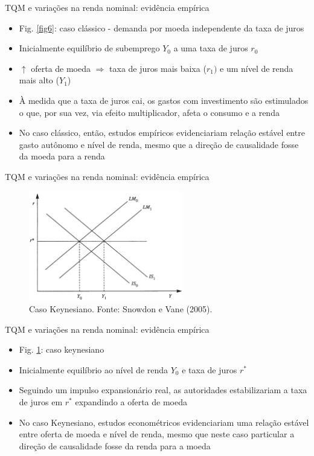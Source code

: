 \documentclass[10pt]{beamer}
\begin{document}
\begin{frame}{TQM e variações na renda nominal: evidência empírica}
    \begin{itemize}
        \item Fig. \ref{fig6}: caso clássico - demanda por moeda independente da taxa de juros
        \bigskip
        \item Inicialmente equilíbrio de subemprego $Y_0$ a uma taxa de juros $r_0$
        \bigskip
        \item $\uparrow$ oferta de moeda $\Rightarrow$ taxa de juros mais baixa ($r_1)$ e um nível de renda mais alto ($Y_1$)
        \bigskip
        \item À medida que a taxa de juros cai, os gastos com investimento são estimulados o que, por sua vez, via efeito multiplicador, afeta o consumo e a renda
        \bigskip
        \item No caso clássico, então, estudos empíricos evidenciariam relação estável entre gasto autônomo e nível de renda, mesmo que a direção de causalidade fosse da moeda para a renda
    \end{itemize}
\end{frame}

\begin{frame}{TQM e variações na renda nominal: evidência empírica}
    \begin{figure}
        \centering
        \includegraphics[width=0.6\textwidth]{./figures/aula10_fig7.PNG}
        \caption{Caso Keynesiano. Fonte: Snowdon e Vane (2005).}
        \label{fig7}
    \end{figure}
\end{frame}

\begin{frame}{TQM e variações na renda nominal: evidência empírica}
    \begin{itemize}
        \item Fig. \ref{fig7}: caso keynesiano
        \bigskip
        \item Inicialmente equilíbrio ao nível de renda $Y_0$ e taxa de juros $r^*$
        \bigskip
        \item Seguindo um impulso expansionário real, as autoridades estabilizariam a taxa de juros em $r^*$ expandindo a oferta de moeda
        \bigskip
        \item No caso Keynesiano, estudos econométricos evidenciariam uma relação estável entre oferta de moeda e nível de renda, mesmo que neste caso particular a direção de causalidade fosse da renda para a moeda
    \end{itemize}
\end{frame}
\end{document}
